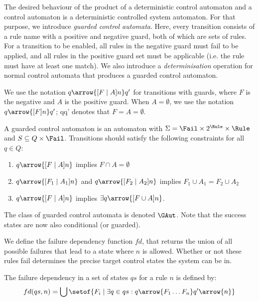 The desired behaviour of the product of a deterministic control automaton and a control automaton is a deterministic controlled system automaton. 
For that purpose, we introduce \emph{guarded control automata}. Here, every transition consists of a rule name with a positive and negative guard, both of which are sets of rules. For a transition to be enabled, all rules in the negative guard must fail to be applied, and all rules in the positive guard set must be applicable (i.e. the rule must have at least one match). We also introduce a \emph{determinisation} operation for normal control automata that produces a guarded control automaton. 

We use the notation $q \arrow{[F \mid A]n} q'$ for transitions with guards, where $F$ is the negative and $A$ is the positive guard. When $A = \emptyset$, we use the notation $q \arrow{[F] n} q'$; qq' denotes that $F = A = \emptyset$.

\begin{definition}\label{def:gca}
A guarded control automaton is an automaton with $\Sigma = \Fail \times
2^{\Rule} \times \Rule$ and $S \subseteq Q \times \Fail$. 
Transitions should satisfy the following constraints for all $q\in Q$:
\begin{enumerate}
\item $q \arrow{[F \mid A] n}$ implies $F \cap A = \emptyset$
\item $q \arrow{[F_1 \mid A_1] n}$ and $q \arrow{[F_2 \mid A_2] n}$ implies
  $F_1 \cup A_1 = F_2 \cup A_2$
\item $q \arrow{[F \mid A ] n}$ implies $\exists q \arrow{[F \cup A] n}$.
\end{enumerate}
\end{definition}
%
The class of guarded control automata is denoted $\GAut$. Note that the success
states are now also conditional (or guarded).

We define the failure dependency function $fd$, that returns the union of all possible failures that lead to a state where $n$ is allowed. Whether or not these rules fail determines the precise target control states the system can be in.

\begin{definition}\label{def:fd}
The failure dependency in a set of states $qs$ for a rule $n$ is defined by:
\begin{align*}
fd(qs,n) = \bigcup \setof{ F_i \mid \exists q \in qs : q \arrow{F_1\dotsc F_n} q' \arrow{n} }
\end{align*}
\end{definition}

